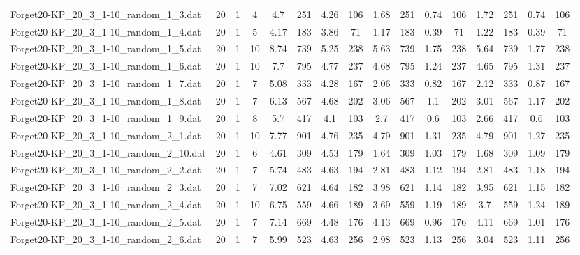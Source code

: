 \begin{sidewaystable}[!ht]
{\begin{tabular}{lccccccccccccccc}
Forget20-KP\_20\_3\_1-10\_random\_1\_3.dat & 20 & 1 & 4 & 4.7 & 251 & 4.26 & 106 & 1.68 & 251 &  \textcolor{blue2}{0.74} & 106 & 1.72 & 251 &  \textcolor{blue2}{0.74} & 106 \\
Forget20-KP\_20\_3\_1-10\_random\_1\_4.dat & 20 & 1 & 5 & 4.17 & 183 & 3.86 & 71 & 1.17 & 183 &  \textcolor{blue2}{0.39} & 71 & 1.22 & 183 &  \textcolor{blue2}{0.39} & 71 \\
Forget20-KP\_20\_3\_1-10\_random\_1\_5.dat & 20 & 1 & 10 & 8.74 & 739 & 5.25 & 238 & 5.63 & 739 & 1.75 & 238 & 5.64 & 739 & 1.77 & 238 \\
Forget20-KP\_20\_3\_1-10\_random\_1\_6.dat & 20 & 1 & 10 & 7.7 & 795 & 4.77 & 237 & 4.68 & 795 & 1.24 & 237 & 4.65 & 795 & 1.31 & 237 \\
Forget20-KP\_20\_3\_1-10\_random\_1\_7.dat & 20 & 1 & 7 & 5.08 & 333 & 4.28 & 167 & 2.06 & 333 & 0.82 & 167 & 2.12 & 333 & 0.87 & 167 \\
Forget20-KP\_20\_3\_1-10\_random\_1\_8.dat & 20 & 1 & 7 & 6.13 & 567 & 4.68 & 202 & 3.06 & 567 &  \textcolor{blue2}{1.1} & 202 & 3.01 & 567 & 1.17 & 202 \\
Forget20-KP\_20\_3\_1-10\_random\_1\_9.dat & 20 & 1 & 8 & 5.7 & 417 & 4.1 & 103 & 2.7 & 417 &  \textcolor{blue2}{0.6} & 103 & 2.66 & 417 &  \textcolor{blue2}{0.6} & 103 \\
Forget20-KP\_20\_3\_1-10\_random\_2\_1.dat & 20 & 1 & 10 & 7.77 & 901 & 4.76 & 235 & 4.79 & 901 & 1.31 & 235 & 4.79 & 901 &  \textcolor{blue2}{1.27} & 235 \\
Forget20-KP\_20\_3\_1-10\_random\_2\_10.dat & 20 & 1 & 6 & 4.61 & 309 & 4.53 & 179 & 1.64 & 309 &  \textcolor{blue2}{1.03} & 179 & 1.68 & 309 & 1.09 & 179 \\
Forget20-KP\_20\_3\_1-10\_random\_2\_2.dat & 20 & 1 & 7 & 5.74 & 483 & 4.63 & 194 & 2.81 & 483 & 1.12 & 194 & 2.81 & 483 & 1.18 & 194 \\
Forget20-KP\_20\_3\_1-10\_random\_2\_3.dat & 20 & 1 & 7 & 7.02 & 621 & 4.64 & 182 & 3.98 & 621 &  \textcolor{blue2}{1.14} & 182 & 3.95 & 621 & 1.15 & 182 \\
Forget20-KP\_20\_3\_1-10\_random\_2\_4.dat & 20 & 1 & 10 & 6.75 & 559 & 4.66 & 189 & 3.69 & 559 &  \textcolor{blue2}{1.19} & 189 & 3.7 & 559 & 1.24 & 189 \\
Forget20-KP\_20\_3\_1-10\_random\_2\_5.dat & 20 & 1 & 7 & 7.14 & 669 & 4.48 & 176 & 4.13 & 669 &  \textcolor{blue2}{0.96} & 176 & 4.11 & 669 & 1.01 & 176 \\
Forget20-KP\_20\_3\_1-10\_random\_2\_6.dat & 20 & 1 & 7 & 5.99 & 523 & 4.63 & 256 & 2.98 & 523 & 1.13 & 256 & 3.04 & 523 &  \textcolor{blue2}{1.11} & 256 \\

\end{tabular}}
\end{sidewaystable}
